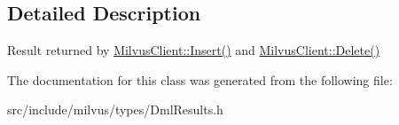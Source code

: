 \subsection{Detailed Description}
Result returned by \hyperlink{classmilvus_1_1_milvus_client_a64a2dca576e0933571a6889910d56390}{Milvus\+Client\+::\+Insert()} and \hyperlink{classmilvus_1_1_milvus_client_a271b16333636621f24aaf89993c72301}{Milvus\+Client\+::\+Delete()} 

The documentation for this class was generated from the following file\+:\begin{DoxyCompactItemize}
\item 
src/include/milvus/types/Dml\+Results.\+h\end{DoxyCompactItemize}
